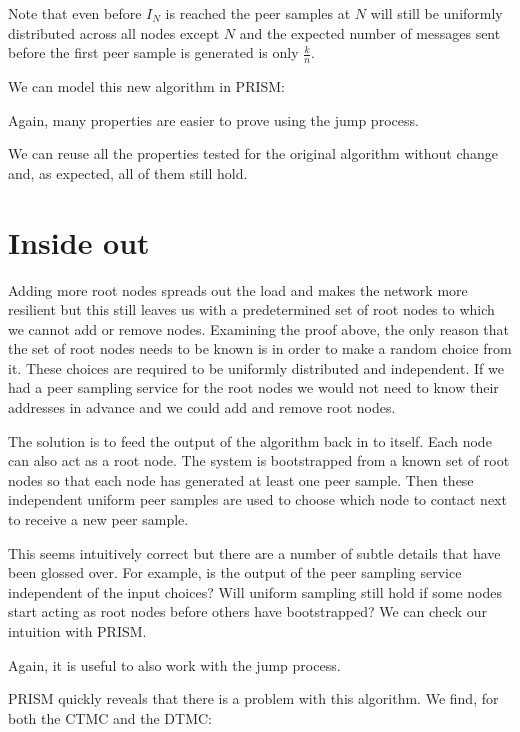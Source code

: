\documentclass[a4paper,10pt]{article}
\newcommand{\code}[1]{
  \footnotesize
  
}
\newcommand{\prismmodel}[1]{
  \begin{quotation}
  \code{../models/#1.sm}
  \end{quotation}
}
\begin{document}
Note that even before $I_N$ is reached the peer samples at $N$ will still be uniformly distributed across all nodes except $N$ and the expected number of messages sent before the first peer sample is generated is only $\frac{k}{n}$.

We can model this new algorithm in PRISM:

\prismmodel{ctmc_multiple}

Again, many properties are easier to prove using the jump process.

\prismmodel{dtmc_multiple}

We can reuse all the properties tested for the original algorithm without change and, as expected, all of them still hold.

\section{Inside out}

Adding more root nodes spreads out the load and makes the network more resilient but this still leaves us with a predetermined set of root nodes to which we cannot add or remove nodes. Examining the proof above, the only reason that the set of root nodes needs to be known is in order to make a random choice from it. These choices are required to be uniformly distributed and independent. If we had a peer sampling service for the root nodes we would not need to know their addresses in advance and we could add and remove root nodes.

The solution is to feed the output of the algorithm back in to itself. Each node can also act as a root node. The system is bootstrapped from a known set of root nodes so that each node has generated at least one peer sample. Then these independent uniform peer samples are used to choose which node to contact next to receive a new peer sample.

This seems intuitively correct but there are a number of subtle details that have been glossed over. For example, is the output of the peer sampling service independent of the input choices? Will uniform sampling still hold if some nodes start acting as root nodes before others have bootstrapped? We can check our intuition with PRISM.

\prismmodel{ctmc_broken}

Again, it is useful to also work with the jump process.

\prismmodel{dtmc_broken}

PRISM quickly reveals that there is a problem with this algorithm. We find, for both the CTMC and the DTMC:
\end{document}
